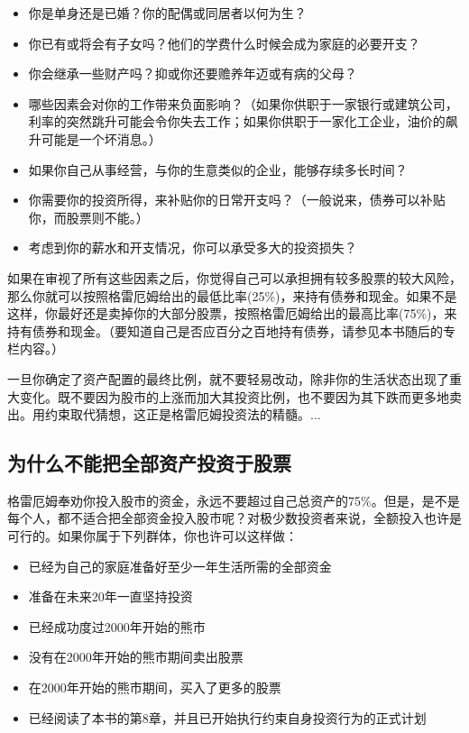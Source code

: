 \documentclass[12pt,oneside]{book}
\begin{document}
\begin{itemize}
\item 你是单身还是已婚？你的配偶或同居者以何为生？
\item 你已有或将会有子女吗？他们的学费什么时候会成为家庭的必要开支？
\item 你会继承一些财产吗？抑或你还要赡养年迈或有病的父母？
\item 哪些因素会对你的工作带来负面影响？（如果你供职于一家银行或建筑公司，利率的突然跳升可能会令你失去工作；如果你供职于一家化工企业，油价的飙升可能是一个坏消息。）
\item 如果你自己从事经营，与你的生意类似的企业，能够存续多长时间？
\item 你需要你的投资所得，来补贴你的日常开支吗？（一般说来，债券可以补贴你，而股票则不能。）
\item 考虑到你的薪水和开支情况，你可以承受多大的投资损失？
\end{itemize}

如果在审视了所有这些因素之后，你觉得自己可以承担拥有较多股票的较大风险，那么你就可以按照格雷厄姆给出的最低比率(25\%)，来持有债券和现金。如果不是这样，你最好还是卖掉你的大部分股票，按照格雷厄姆给出的最高比率(75\%)，来持有债券和现金。（要知道自己是否应百分之百地持有债券，请参见本书随后的专栏内容。）

一旦你确定了资产配置的最终比例，就不要轻易改动，除非你的生活状态出现了重大变化。既不要因为股市的上涨而加大其投资比例，也不要因为其下跌而更多地卖出。用约束取代猜想，这正是格雷厄姆投资法的精髓。...


\subsection{为什么不能把全部资产投资于股票}
格雷厄姆奉劝你投入股市的资金，永远不要超过自己总资产的75\%。但是，是不是每个人，都不适合把全部资金投入股市呢？对极少数投资者来说，全额投入也许是可行的。如果你属于下列群体，你也许可以这样做：

\begin{itemize}
\item 已经为自己的家庭准备好至少一年生活所需的全部资金
\item 准备在未来20年一直坚持投资
\item 已经成功度过2000年开始的熊市
\item 没有在2000年开始的熊市期间卖出股票
\item 在2000年开始的熊市期间，买入了更多的股票
\item 已经阅读了本书的第8章，并且已开始执行约束自身投资行为的正式计划

\end{itemize}
\end{document}
